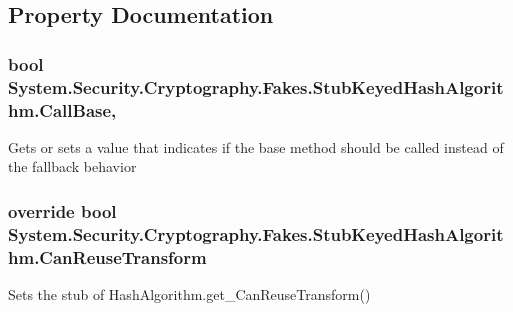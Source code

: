 \subsection{Property Documentation}
\hypertarget{class_system_1_1_security_1_1_cryptography_1_1_fakes_1_1_stub_keyed_hash_algorithm_aab85e99213d69da15c1b538f1f96ed49}{
\subsubsection[{Call\-Base}]{\setlength{\rightskip}{0pt plus 5cm}bool System.\-Security.\-Cryptography.\-Fakes.\-Stub\-Keyed\-Hash\-Algorithm.\-Call\-Base\hspace{0.3cm}{\ttfamily [get]}, {\ttfamily [set]}}}\label{class_system_1_1_security_1_1_cryptography_1_1_fakes_1_1_stub_keyed_hash_algorithm_aab85e99213d69da15c1b538f1f96ed49}


Gets or sets a value that indicates if the base method should be called instead of the fallback behavior

\hypertarget{class_system_1_1_security_1_1_cryptography_1_1_fakes_1_1_stub_keyed_hash_algorithm_af8c53fa8c67b21f3ce44db48fdc4ecb7}{
\subsubsection[{Can\-Reuse\-Transform}]{\setlength{\rightskip}{0pt plus 5cm}override bool System.\-Security.\-Cryptography.\-Fakes.\-Stub\-Keyed\-Hash\-Algorithm.\-Can\-Reuse\-Transform\hspace{0.3cm}{\ttfamily [get]}}}\label{class_system_1_1_security_1_1_cryptography_1_1_fakes_1_1_stub_keyed_hash_algorithm_af8c53fa8c67b21f3ce44db48fdc4ecb7}


Sets the stub of Hash\-Algorithm.\-get\-\_\-\-Can\-Reuse\-Transform()

